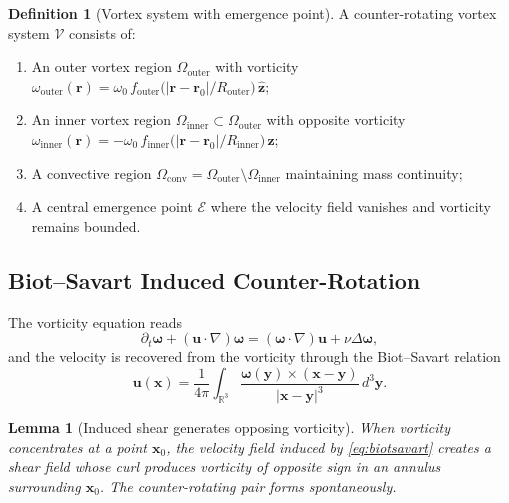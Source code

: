 \documentclass[11pt,a4paper]{article}
\theoremstyle{plain}
\newtheorem{lemma}[theorem]{Lemma}
\theoremstyle{definition}
\newtheorem{definition}[theorem]{Definition}
\begin{document}
\begin{definition}[Vortex system with emergence point]
\label{def:system}
A counter-rotating vortex system $\mathcal{V}$ consists of:
\begin{enumerate}[label=\textnormal{(\roman*)}]
\item An outer vortex region $\Omega_{\mathrm{outer}}$ with vorticity
$\omega_{\mathrm{outer}}(\mathbf{r}) = \omega_{0}\,
f_{\mathrm{outer}}\bigl(|\mathbf{r} - \mathbf{r}_{0}|/R_{\mathrm{outer}}\bigr)\,\hat{\mathbf{z}}$;
\item An inner vortex region
$\Omega_{\mathrm{inner}} \subset \Omega_{\mathrm{outer}}$ with opposite
vorticity
$\omega_{\mathrm{inner}}(\mathbf{r}) = -\omega_{0}\,
f_{\mathrm{inner}}\bigl(|\mathbf{r} - \mathbf{r}_{0}|/R_{\mathrm{inner}}\bigr)\,\hat{\mathbf{z}}$;
\item A convective region
$\Omega_{\mathrm{conv}} = \Omega_{\mathrm{outer}}\setminus
\Omega_{\mathrm{inner}}$ maintaining mass continuity;
\item A central emergence point $\mathcal{E}$ where the velocity field
vanishes and vorticity remains bounded.
\end{enumerate}
\end{definition}

\subsection{Biot--Savart Induced Counter-Rotation}

The vorticity equation reads
\begin{equation}
\partial_{t}\boldsymbol{\omega} + (\mathbf{u}\cdot\nabla)\boldsymbol{\omega}
 = (\boldsymbol{\omega}\cdot\nabla)\mathbf{u}
   + \nu\Delta\boldsymbol{\omega},
\label{eq:vorticity}
\end{equation}
and the velocity is recovered from the vorticity through the
Biot--Savart relation
\begin{equation}
\mathbf{u}(\mathbf{x}) = \frac{1}{4\pi}\int_{\mathbb{R}^{3}}
   \frac{\boldsymbol{\omega}(\mathbf{y})\times(\mathbf{x}-\mathbf{y})}
        {|\mathbf{x}-\mathbf{y}|^{3}}\,d^{3}\mathbf{y}.
\label{eq:biotsavart}
\end{equation}

\begin{lemma}[Induced shear generates opposing vorticity]
\label{lem:induced}
When vorticity concentrates at a point $\mathbf{x}_{0}$, the velocity
field induced by \eqref{eq:biotsavart} creates a shear field whose
curl produces vorticity of opposite sign in an annulus surrounding
$\mathbf{x}_{0}$. The counter-rotating pair forms spontaneously.
\end{lemma}
\end{document}
